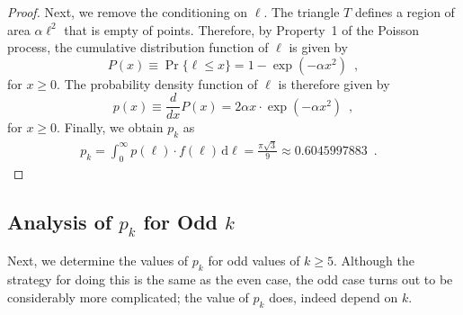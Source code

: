 \documentclass[twoside,leqno,twocolumn]{article}
\newcommand\qedhere{}{}
\begin{document}
\begin{proof}
  Next, we remove the conditioning on $\ell$.  The triangle $T$ defines a
  region of area $\alpha\ell^2$ that is empty of points.  Therefore,
  by Property~1 of the Poisson process, the cumulative distribution
  function of $\ell$ is given by
  \[
    P(x) \equiv \Pr\{\ell \le x\} = 1-\exp(-\alpha x^2) \enspace ,
  \]
  for $x\ge 0$. The probability density function of $\ell$ is therefore 
  given by 
  \[
     p(x) \equiv \frac{d}{dx}P(x) =
     2\alpha x\cdot\exp(-\alpha x^2) \enspace ,
  \]
  for $x\ge 0$.  Finally, we obtain $p_k$ as
  \begin{align*}
     p_k = \int_0^\infty p(\ell)\cdot f(\ell)\,\mathrm{d}\ell 
     = \frac{\pi\sqrt{3}}{9}
      \approx 0.6045997883  \enspace . & \qedhere
  \end{align*}
\end{proof}


\subsection{Analysis of $p_k$ for Odd $k$}

Next, we determine the values of $p_k$ for odd values of $k\ge 5$.
Although the strategy for doing this is the same as the even case,
the odd case turns out to be considerably more complicated; the value
of $p_k$ does, indeed depend on $k$.
\end{document}
